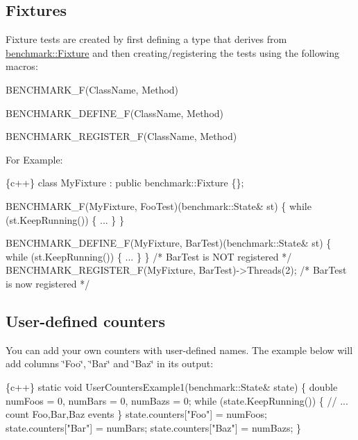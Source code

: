 \subsection*{Fixtures}

Fixture tests are created by first defining a type that derives from \mbox{\hyperlink{classbenchmark_1_1_fixture}{benchmark\+::\+Fixture}} and then creating/registering the tests using the following macros\+:


\begin{DoxyItemize}
\item {\ttfamily B\+E\+N\+C\+H\+M\+A\+R\+K\+\_\+\+F(\+Class\+Name, Method)}
\item {\ttfamily B\+E\+N\+C\+H\+M\+A\+R\+K\+\_\+\+D\+E\+F\+I\+N\+E\+\_\+\+F(\+Class\+Name, Method)}
\item {\ttfamily B\+E\+N\+C\+H\+M\+A\+R\+K\+\_\+\+R\+E\+G\+I\+S\+T\+E\+R\+\_\+\+F(\+Class\+Name, Method)}
\end{DoxyItemize}

For Example\+:


\begin{DoxyCode}
\{c++\}
class MyFixture : public benchmark::Fixture \{\};

BENCHMARK\_F(MyFixture, FooTest)(benchmark::State& st) \{
   while (st.KeepRunning()) \{
     ...
  \}
\}

BENCHMARK\_DEFINE\_F(MyFixture, BarTest)(benchmark::State& st) \{
   while (st.KeepRunning()) \{
     ...
  \}
\}
/* BarTest is NOT registered */
BENCHMARK\_REGISTER\_F(MyFixture, BarTest)->Threads(2);
/* BarTest is now registered */
\end{DoxyCode}


\subsection*{User-\/defined counters}

You can add your own counters with user-\/defined names. The example below will add columns \char`\"{}\+Foo\char`\"{}, \char`\"{}\+Bar\char`\"{} and \char`\"{}\+Baz\char`\"{} in its output\+:


\begin{DoxyCode}
\{c++\}
static void UserCountersExample1(benchmark::State& state) \{
  double numFoos = 0, numBars = 0, numBazs = 0;
  while (state.KeepRunning()) \{
    // ... count Foo,Bar,Baz events
  \}
  state.counters["Foo"] = numFoos;
  state.counters["Bar"] = numBars;
  state.counters["Baz"] = numBazs;
\}
\end{DoxyCode}


